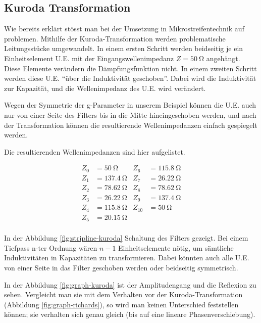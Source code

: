 \subsection{Kuroda Transformation}

Wie bereits erkl\"art st\"osst man bei der  Umsetzung  in Mikrostreifentechnik
auf  problemen.  Mithilfe  der  Kuroda-Transformation   werden  problematische
Leitungsst\"ucke umgewandelt. In einem ersten Schritt werden beidseitig je ein
Einheitselement  U.E.  mit  der  Eingangswellenimpedanz  $Z  =  \SI{50}{\ohm}$
angeh\"angt.  Diese Elemente ver\"andern  die  D\"ampfungsfunktion  nicht.  In
einem   zweiten   Schritt   werden  diese  U.E.  ``\"uber  die  Induktivit\"at
geschoben''.   Dabei  wird  die  Induktivit\"at  zur  Kapazit\"at,   und   die
Wellenimpedanz des U.E. wird ver\"andert.

Wegen der Symmetrie der g-Parameter in unserem Beispiel k\"onnen die U.E. auch
nur von einer Seite  des  Filters bis in die Mitte hineingeschoben werden, und
nach  der Transformation k\"onnen die resultierende  Wellenimpedanzen  einfach
gespiegelt werden.

Die resultierenden Wellenimpedanzen sind hier aufgelistet.

\begin{align*}
    Z_0  &= \SI{50}{\ohm}    & Z_6  &= \SI{115.8}{\ohm} \\
    Z_1  &= \SI{137.4}{\ohm} & Z_7  &= \SI{26.22}{\ohm} \\
    Z_2  &= \SI{78.62}{\ohm} & Z_8  &= \SI{78.62}{\ohm} \\
    Z_3  &= \SI{26.22}{\ohm} & Z_9  &= \SI{137.4}{\ohm} \\
    Z_4  &= \SI{115.8}{\ohm} & Z_10 &= \SI{50   }{\ohm} \\
    Z_5  &= \SI{20.15}{\ohm} &      &                   \\
\end{align*}

In der Abbildung \ref{fig:stripline-kuroda} Schaltung des Filters gezeigt. Bei
einem  Tiefpass n-ter Ordnung w\"aren $n -  1$  Einheitselemente  n\"otig,  um
s\"amtliche  Induktivit\"aten  in  Kapazit\"aten  zu   transformieren.   Dabei
k\"onnten auch alle U.E. von einer  Seite  in das Filter geschoben werden oder
beidseitig symmetrisch.

In  der  Abbildung  \ref{fig:graph-kuroda}  ist  der  Amplitudengang  und  die
Reflexion  zu  sehen.  Vergleicht  man  sie  mit   dem   Verhalten   vor   der
Kuroda-Transformation (Abbildung \ref{fig:graph-richards}), so wird man keinen
Unterschied  feststellen  k\"onnen;  sie verhalten sich genau gleich (bis  auf
eine lineare Phasenverschiebung).

